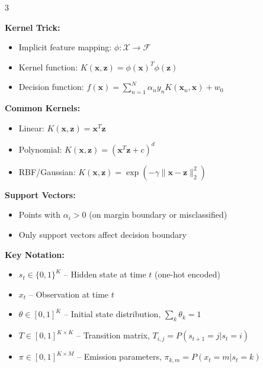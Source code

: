 \documentclass[10pt,landscape]{article}
\begin{document}
\begin{multicols}{3}
\begin{tcolorbox}[breakable, title=Support Vector Machines, colback=svm, boxsep=1pt, left=1pt, right=1pt, top=1pt, bottom=1pt]
\textbf{Kernel Trick:}
\begin{itemize}[leftmargin=*,noitemsep,topsep=0pt]
    \item Implicit feature mapping: $\phi: \mathcal{X} \rightarrow \mathcal{F}$
    \item Kernel function: $K(\mathbf{x},\mathbf{z}) = \phi(\mathbf{x})^T\phi(\mathbf{z})$
    \item Decision function: $f(\mathbf{x}) = \sum_{n=1}^N \alpha_n y_n K(\mathbf{x}_n, \mathbf{x}) + w_0$
\end{itemize}

\textbf{Common Kernels:}
\begin{itemize}[leftmargin=*,noitemsep,topsep=0pt]
    \item Linear: $K(\mathbf{x},\mathbf{z}) = \mathbf{x}^T\mathbf{z}$
    \item Polynomial: $K(\mathbf{x},\mathbf{z}) = (\mathbf{x}^T\mathbf{z} + c)^d$
    \item RBF/Gaussian: $K(\mathbf{x},\mathbf{z}) = \exp(-\gamma\|\mathbf{x}-\mathbf{z}\|_2^2)$
\end{itemize}

\textbf{Support Vectors:}
\begin{itemize}[leftmargin=*,noitemsep,topsep=0pt]
    \item Points with $\alpha_i > 0$ (on margin boundary or misclassified)
    \item Only support vectors affect decision boundary
\end{itemize}
\end{tcolorbox}

\begin{tcolorbox}[breakable, title=Hidden Markov Models, colback=hmm, boxsep=1pt, left=1pt, right=1pt, top=1pt, bottom=1pt]
\textbf{Key Notation:}
\begin{itemize}[leftmargin=*,noitemsep,topsep=0pt]
    \item $s_t \in \{0,1\}^K$ -- Hidden state at time $t$ (one-hot encoded)
    \item $x_t$ -- Observation at time $t$
    \item $\theta \in [0,1]^K$ -- Initial state distribution, $\sum_k \theta_k = 1$
    \item $T \in [0,1]^{K \times K}$ -- Transition matrix, $T_{i,j} = P(s_{t+1} = j | s_t = i)$
    \item $\pi \in [0,1]^{K \times M}$ -- Emission parameters, $\pi_{k,m} = P(x_t = m | s_t = k)$
\end{itemize}


\end{tcolorbox}
\end{multicols}
\end{document}
